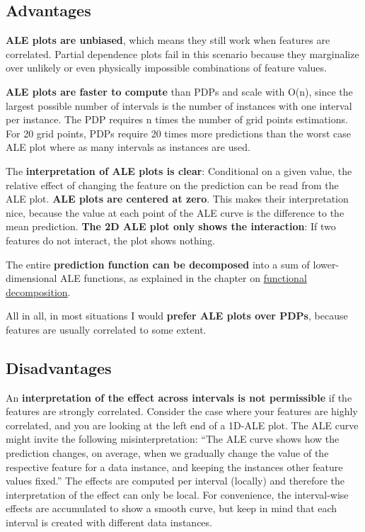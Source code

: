 \documentclass[
  11pt,
]{scrbook}
\begin{document}
\hypertarget{advantages-6}{%
\subsection{Advantages}\label{advantages-6}}

\textbf{ALE plots are unbiased}, which means they still work when features are correlated.
Partial dependence plots fail in this scenario because they marginalize over unlikely or even physically impossible combinations of feature values.

\textbf{ALE plots are faster to compute} than PDPs and scale with O(n), since the largest possible number of intervals is the number of instances with one interval per instance.
The PDP requires n times the number of grid points estimations.
For 20 grid points, PDPs require 20 times more predictions than the worst case ALE plot where as many intervals as instances are used.

The \textbf{interpretation of ALE plots is clear}: Conditional on a given value, the relative effect of changing the feature on the prediction can be read from the ALE plot.
\textbf{ALE plots are centered at zero}.
This makes their interpretation nice, because the value at each point of the ALE curve is the difference to the mean prediction.
\textbf{The 2D ALE plot only shows the interaction}:
If two features do not interact, the plot shows nothing.

The entire \textbf{prediction function can be decomposed} into a sum of lower-dimensional ALE functions, as explained in the chapter on \protect\hyperlink{decomposition}{functional decomposition}.

All in all, in most situations I would \textbf{prefer ALE plots over PDPs}, because features are usually correlated to some extent.

\hypertarget{disadvantages-6}{%
\subsection{Disadvantages}\label{disadvantages-6}}

An \textbf{interpretation of the effect across intervals is not permissible} if the features are strongly correlated.
Consider the case where your features are highly correlated, and you are looking at the left end of a 1D-ALE plot.
The ALE curve might invite the following misinterpretation:
``The ALE curve shows how the prediction changes, on average, when we gradually change the value of the respective feature for a data instance, and keeping the instances other feature values fixed.''
The effects are computed per interval (locally) and therefore the interpretation of the effect can only be local.
For convenience, the interval-wise effects are accumulated to show a smooth curve, but keep in mind that each interval is created with different data instances.
\end{document}
